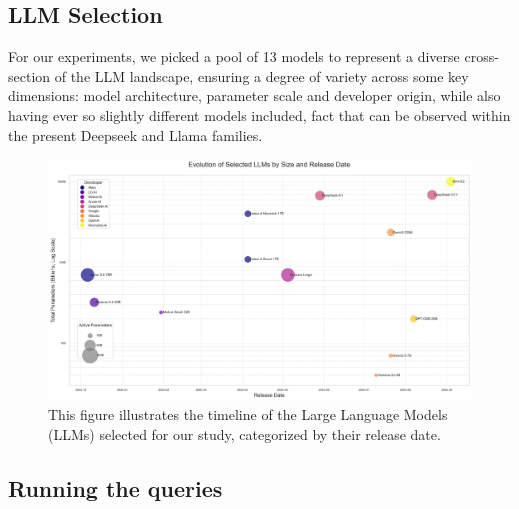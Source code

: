 \documentclass[11pt]{article}
\begin{document}
\subsection{LLM Selection} %
For our experiments, we picked a pool of 13 models to represent a diverse cross-section of the LLM landscape, ensuring a degree of variety across some key dimensions: model architecture, parameter scale and developer origin, while also having ever so slightly different models included, fact that can be observed within the present Deepseek \cite{deepseekai2025} and Llama families.
\begin{figure}[htbp]
    \centering
    \includegraphics[width=\textwidth]{../analysis_reports/model_timeline_plot.png}
    \caption{This figure illustrates the timeline of the Large Language Models (LLMs) selected for our study, categorized by their release date.}
    \label{fig:model_timeline}
\end{figure}
\newpage

\subsection{Running the queries}
\end{document}
